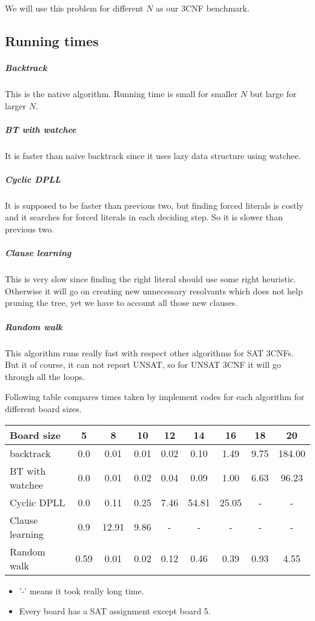 \documentclass[a4paper]{article}
\begin{document}
We will use this problem for different $N$ as our 3CNF benchmark.

\subsection{Running times}

\subparagraph{Backtrack}
This is the native algorithm. Running time is small for smaller $N$ but large for larger $N$.

\subparagraph{BT with watchee}
It is faster than naive backtrack since it uses lazy data structure using watchee.

\subparagraph{Cyclic DPLL}
It is supposed to be faster than previous two, but finding forced literals is costly and it searches for forced literals in each deciding step. So it is slower than previous two.

\subparagraph{Clause learning}
This is very slow since finding the right literal should use some right heuristic. Otherwise it will go on creating new unnecessary resolvants which does not help pruning the tree, yet we have to account all those new clauses.

\subparagraph{Random walk}
This algorithm runs really fast with respect other algorithms for SAT 3CNFs. But it of course, it can not report UNSAT, so for UNSAT 3CNF it will go through all the loops.

\vspace{1em}

Following table compares times taken by implement codes for each algorithm for different board sizes.
\begin{center}
{
\centering
\begin{tabular}{|l|c|c|c|c|c|c|c|c|}
\hline
Board size & 5 & 8 & 10 & 12 & 14 & 16 & 18 & 20 \\ \hline
backtrack & 0.0 & 0.01 & 0.01 & 0.02 & 0.10 & 1.49 & 9.75 & 184.00 \\ \hline
BT with watchee & 0.0 & 0.01 & 0.02 & 0.04 & 0.09 & 1.00 & 6.63 & 96.23 \\ \hline
Cyclic DPLL & 0.0 & 0.11 & 0.25 & 7.46 & 54.81 & 25.05 & - & - \\ \hline
Clause learning & 0.9 & 12.91 & 9.86 & - & - & - & - & - \\ \hline
Random walk & 0.59 & 0.01 & 0.02 & 0.12 & 0.46 & 0.39 & 0.93 & 4.55 \\ \hline
\end{tabular}
}
\end{center}
\begin{itemize}
\item '-' means it took really long time.
\item Every board has a SAT assignment except board 5.
\end{itemize}
\end{document}

